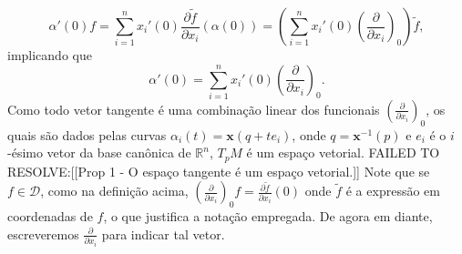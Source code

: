 \begin{equation*}
    \alpha'(0)f=\sum_{i=1}^{n}x_{i}'(0)\frac{\partial \tilde{{f}}}{\partial x_{i}}(\alpha(0)) = \left(\sum_{i=1}^{n}x_{i}'(0)\left( \frac{\partial}{\partial x_{i}} \right)_{0}\right)\tilde{f},
\end{equation*}
implicando que
\begin{equation*}
    \alpha'(0)=\sum_{i=1}^{n}x_{i}'(0)\left( \frac{\partial}{\partial x_{i}} \right)_{0}.
\end{equation*}
Como todo vetor tangente é uma combinação linear dos funcionais $\left( \frac{\partial}{\partial x_{i}} \right)_{0}$, os quais são dados pelas curvas $\alpha _i(t)=\mathbf{x}(q+te_{i})$, onde $q=\mathbf{x}^{-1}(p)$ e $e_{i}$ é o $i$-ésimo vetor da base canônica de $\mathbb{R}^{n}$, $T_{p}M$ é um espaço vetorial. FAILED TO RESOLVE:[[Prop 1 - O espaço tangente é um espaço vetorial.]] Note que se $f \in \mathcal{D}$, como na definição acima,  $\left( \frac{\partial}{\partial x_{i}} \right)_{0}f=\frac{\partial \tilde{f}}{\partial x_{i}}(0)$ onde $\tilde{f}$ é a expressão em coordenadas de $f$, o que justifica a notação empregada. De agora em diante, escreveremos $\frac{\partial}{\partial x_{i}}$ para indicar tal vetor.

